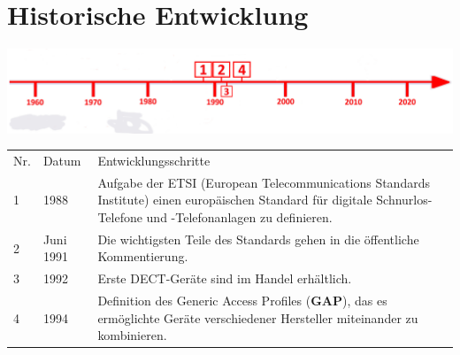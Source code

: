 \section*{Historische Entwicklung}
\includegraphics[width=\textwidth]{Kapitel/DECT/Grafiken/ZeitstrahlDect}
\par
\noindent
{}
\begin{tabular}{p{0.5 cm}p{1.5 cm}p{15.55 cm}}
	Nr. & Datum & Entwicklungsschritte~\cite{dect.9}\\
	1 & 1988 & Aufgabe der ETSI (European Telecommunications Standards Institute) einen europäischen Standard für digitale Schnurlos-Telefone und -Telefonanlagen zu definieren.\\
	2 & Juni 1991 & Die wichtigsten Teile des Standards gehen in die öffentliche Kommentierung.\\
	3 & 1992 & Erste DECT-Geräte sind im Handel erhältlich.\\
	4 & 1994  & Definition des Generic Access Profiles (\textbf{GAP}), das es ermöglichte Geräte verschiedener Hersteller miteinander zu kombinieren.\\
\end{tabular}
\par
